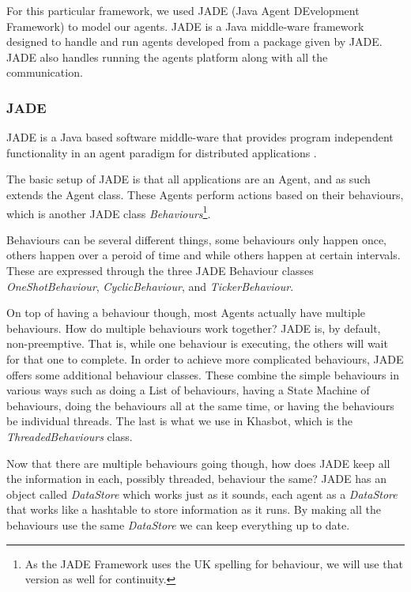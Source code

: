 \documentclass[letterpaper]{article}
\begin{document}
For this particular framework, we used JADE (Java Agent DEvelopment Framework) to model our agents.  JADE is a Java middle-ware framework designed to handle and run agents developed from a package given by JADE.  JADE also handles running the agents platform along with all the communication\cite{JADEbook}.

\subsubsection{JADE}

JADE is a Java based software middle-ware that provides program independent functionality in an agent paradigm for distributed applications \cite{JADEbook}.

The basic setup of JADE is that all applications are an Agent, and as such extends the Agent class.  These Agents perform actions based on their behaviours, which is another JADE class \emph{Behaviours}\footnote{As the JADE Framework uses the UK spelling for behaviour, we will use that version as well for continuity.}.

Behaviours can be several different things, some behaviours only happen once, others happen over a peroid of time and while others happen at certain intervals.  These are expressed through the three JADE Behaviour classes \emph{OneShotBehaviour}, \emph{CyclicBehaviour}, and \emph{TickerBehaviour}.

On top of having a behaviour though, most Agents actually have multiple behaviours.  How do multiple behaviours work together?  JADE is, by default, non-preemptive.  That is, while one behaviour is executing, the others will wait for that one to complete.  In order to achieve more complicated behaviours, JADE offers some additional behaviour classes.  These combine the simple behaviours in various ways such as doing a List of behaviours, having a State Machine of behaviours, doing the behaviours all at the same time, or having the behaviours be individual threads.  The last is what we use in Khasbot, which is the \emph{ThreadedBehaviours} class.

Now that there are multiple behaviours going though, how does JADE keep all the information in each, possibly threaded, behaviour the same?  JADE has an object called \emph{DataStore} which works just as it sounds, each agent as a \emph{DataStore} that works like a hashtable to store information as it runs.  By making all the behaviours use the same \emph{DataStore} we can keep everything up to date.
\end{document}
